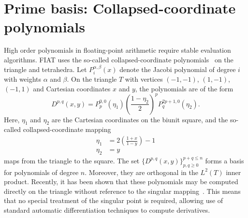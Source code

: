 \section{Prime basis: Collapsed-coordinate polynomials}

High order polynomials in floating-point arithmetic require stable
evaluation algorithms.  FIAT uses the so-called collapsed-coordinate
polynomials~\citep{KarniadakisSherwin2005} on the triangle and tetrahedra.  Let
\(P^{\alpha,\beta}_i(x) \) denote the Jacobi polynomial of degree \( i
\) with weights \( \alpha \) and \( \beta \).  On the triangle \( T \)
with vertices \( (-1,-1) \), \((1,-1) \), \( (-1,1) \) and Cartesian
coordinates \( x\) and \( y \), the polynomials are of the form
\[
  D^{p,q}( x,y ) = P^{0,0}_{p}(\eta_1)  \left( \frac{1-\eta_2}{2}
  \right)^p P^{2p+1,0}_q(\eta_2).
\]
Here, \( \eta_1 \) and \( \eta_2 \) are the Cartesian coordinates on
the biunit square, and the so-called collapsed-coordinate mapping
\[
\begin{split}
\eta_1 & = 2\left( \frac{1+x}{1-y} \right) - 1
\\
\eta_2 & = y
\end{split}
\]
maps from the triangle to the square.  The set \( \{ D^{p,q}( x,y)
\}_{p,q \geq 0}^{p+q\leq n} \) forms a basis for polynomials of
degree \( n \).  Moreover, they are orthogonal in the \( L^2(T) \)
inner product.  Recently, it has been shown that these polynomials
may be computed directly on the triangle without reference to the
singular mapping~\citep{Kirby2009}.  This means that no special treatment
of the singular point is required, allowing use of standard automatic
differentiation techniques to compute derivatives.

